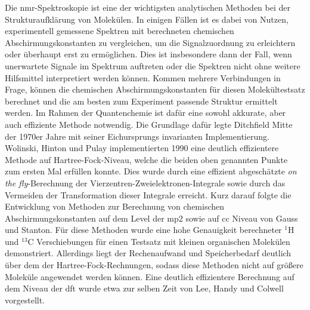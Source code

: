 Die \ac{nmr}-Spektroskopie ist eine der wichtigsten analytischen Methoden bei der Strukturaufklärung von Molekülen. In einigen Fällen ist es dabei von Nutzen, experimentell gemessene Spektren mit berechneten chemischen Abschirmungskonstanten zu vergleichen, um die Signalzuordnung zu erleichtern oder überhaupt erst zu ermöglichen. Dies ist insbesondere dann der Fall, wenn unerwartete Signale im Spektrum auftreten oder die Spektren nicht ohne weitere Hilfsmittel interpretiert werden können. Kommen mehrere Verbindungen in Frage, können die chemischen Abschirmungskonstanten für diesen Molekültestsatz berechnet und die am besten zum Experiment passende Struktur ermittelt werden. Im Rahmen der Quantenchemie ist dafür eine sowohl akkurate, aber auch effiziente Methode notwendig. Die Grundlage dafür legte Ditchfield\supercite{ditchfield1974self} Mitte der 1970er Jahre mit seiner Eichursprungs invarianten Implementierung. Wolinski, Hinton und Pulay\supercite{wolinski1990efficient} implementierten 1990 eine deutlich effizientere Methode auf Hartree-Fock-Niveau, welche die beiden oben genannten Punkte zum ersten Mal erfüllen konnte. Dies wurde durch eine effizient abgeschätzte \glqq \textit{on the fly}\grqq{}-Berechnung der Vierzentren-Zweielektronen-Integrale sowie durch das Vermeiden der Transformation dieser Integrale erreicht. Kurz darauf folgte die Entwicklung von Methoden zur Berechnung von chemischen Abschirmungskonstanten auf dem Level der \ac{mp2}\supercite{gauss1992calculation} sowie auf \ac{cc}\supercite{gauss1995gauge} Niveau von Gauss und Stanton. Für diese Methoden wurde eine hohe Genauigkeit berechneter $^1$H und $^{13}$C Verschiebungen für einen Testsatz mit kleinen organischen Molekülen demonstriert. Allerdings liegt der Rechenaufwand und Speicherbedarf deutlich über dem der Hartree-Fock-Rechnungen, sodass diese Methoden nicht auf größere Moleküle angewendet werden können. Eine deutlich effizientere Berechnung auf dem Niveau der \ac{dft} wurde etwa zur selben Zeit von Lee, Handy und Colwell\supercite{lee1995density} vorgestellt. 

